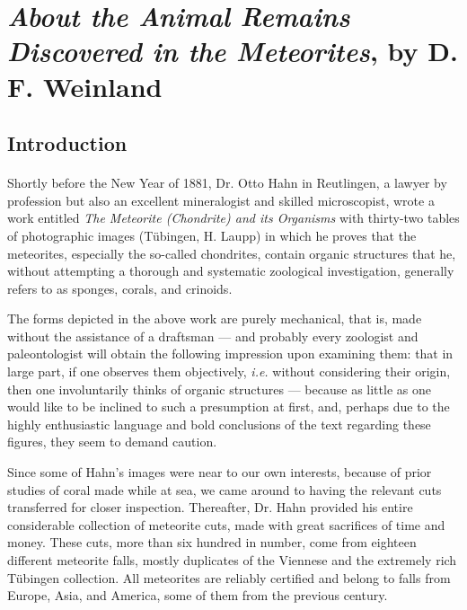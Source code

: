 \documentclass[a4paper, 12pt, oneside]{article}
\begin{document}
\section{\emph{About the Animal Remains Discovered in the Meteorites}, by D. F. Weinland}
\subsection*{Introduction}
\paragraph*{}
Shortly before the New Year of 1881, Dr. Otto Hahn in Reutlingen, a lawyer by profession but also an excellent mineralogist and skilled microscopist, wrote a work entitled \emph{The Meteorite (Chondrite) and its Organisms} with thirty-two tables of photographic images (Tübingen, H. Laupp) in which he proves that the meteorites, especially the so-called chondrites, contain organic structures that he, without attempting a thorough and systematic zoological investigation, generally refers to as sponges, corals, and crinoids.

The forms depicted in the above work are purely mechanical, that is, made without the assistance of a draftsman --- and probably every zoologist and paleontologist will obtain the following impression upon examining them: that in large part, if one observes them objectively, \emph{i.e.} without considering their origin, then one involuntarily thinks of organic structures --- because as little as one would like to be inclined to such a presumption at first, and, perhaps due to the highly enthusiastic language and bold conclusions of the text regarding these figures, they seem to demand caution.

Since some of Hahn's images were near to our own interests, because of prior studies of coral made while at sea, we came around to having the relevant cuts transferred for closer inspection. Thereafter, Dr. Hahn provided his entire considerable collection of meteorite cuts, made with great sacrifices of time and money. These cuts, more than six hundred in number, come from eighteen different meteorite falls, mostly duplicates of the Viennese and the extremely rich Tübingen collection. All meteorites are reliably certified and belong to falls from Europe, Asia, and America, some of them from the previous century.
\end{document}
